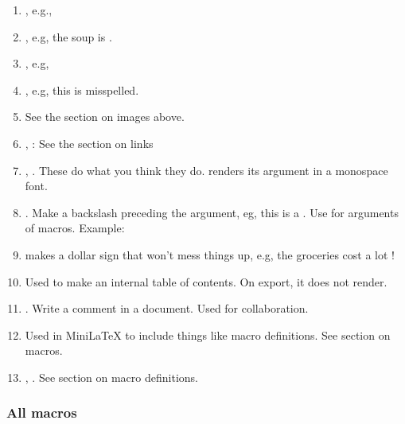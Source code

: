 \begin{enumerate}

\item {}, e.g., 

\item {}, e.g, the soup is .

\item {}, e.g, 

\item {}, e.g, this is  misspelled.

\item {} See the section on images above.

\item {},  : See the section on links

\item  {},  .  These do what you think they do.    renders its argument in a monospace font.

\item  {}.  Make a backslash preceding the argument, eg, this is a .  Use  for arguments of macros. Example: 

\item  {} makes a dollar sign that won't mess things up, e.g, the groceries cost  a lot \dollar\dollar!

\item {} Used to make an internal table of contents.  On export, it does not render.

\item {}.  Write a comment in a document. Used for collaboration.

\item {} Used in MiniLaTeX to include things like macro definitions.  See section on macros.

\item {}, . See section on macro definitions.


\end{enumerate}

\subsubsection{All macros}

